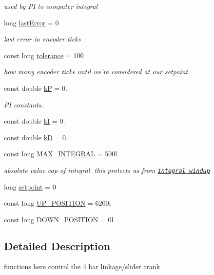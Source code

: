 \begin{DoxyCompactItemize}
\begin{DoxyCompactList}\small\item\em used by P\-I to computer integral \end{DoxyCompactList}\item 
long \hyperlink{classArm_a5061b95381cc72d417f5a5275b871e47}{last\-Error} = 0
\begin{DoxyCompactList}\small\item\em last error in encoder ticks \end{DoxyCompactList}\item 
const long \hyperlink{classArm_afb4e56fd59b92d0b4c157c0ea7fe9db8}{tolerance} = 100
\begin{DoxyCompactList}\small\item\em how many encoder ticks until we're considered at our setpoint \end{DoxyCompactList}\item 
const double \hyperlink{classArm_ac6d95b0c5f8a7700b3d25a9fcead2291}{k\-P} = 0.
\begin{DoxyCompactList}\small\item\em P\-I constants. \end{DoxyCompactList}\item 
const double \hyperlink{classArm_a15dca8014bd3994a0d9b62efc0bcb983}{k\-I} = 0.
\item 
const double \hyperlink{classArm_aba816c407060b76429a785f6b15a6980}{k\-D} = 0.
\item 
const long \hyperlink{classArm_a05988f2c31e40dd3894c1343bf73a7b8}{M\-A\-X\-\_\-\-I\-N\-T\-E\-G\-R\-A\-L} = 500l
\begin{DoxyCompactList}\small\item\em absolute value cap of integral. this protects us from \href{https://en.wikipedia.org/wiki/Integral_windup}{\tt integral windup} \end{DoxyCompactList}\item 
long \hyperlink{classArm_aa168ca685ff8170699ca535590c2af14}{setpoint} = 0
\item 
const long \hyperlink{classArm_a44fed3661f22f9acd7f3cd8635a4fc6a}{U\-P\-\_\-\-P\-O\-S\-I\-T\-I\-O\-N} = 6200l
\item 
const long \hyperlink{classArm_a3a95b43d43f1e4858829ff474555f81f}{D\-O\-W\-N\-\_\-\-P\-O\-S\-I\-T\-I\-O\-N} = 0l
\end{DoxyCompactItemize}


\subsection{Detailed Description}
functions here control the 4 bar linkage/slider crank 

